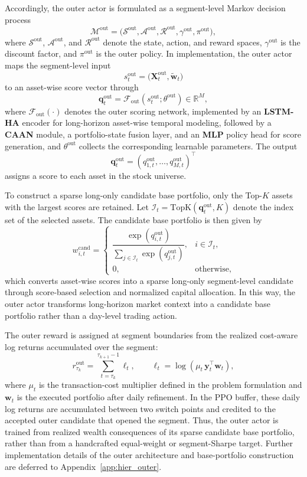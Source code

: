 \documentclass[letterpaper]{article} %
\begin{document}
Accordingly, the outer actor is formulated as a segment-level Markov decision process
\[
\mathcal{M}^{\mathrm{out}}
=
\bigl(
\mathcal{S}^{\mathrm{out}},
\mathcal{A}^{\mathrm{out}},
\mathcal{R}^{\mathrm{out}},
\gamma^{\mathrm{out}},
\pi^{\mathrm{out}}
\bigr),
\]
where \(\mathcal{S}^{\mathrm{out}}\), \(\mathcal{A}^{\mathrm{out}}\), and \(\mathcal{R}^{\mathrm{out}}\) denote the state, action, and reward spaces, \(\gamma^{\mathrm{out}}\) is the discount factor, and \(\pi^{\mathrm{out}}\) is the outer policy. In implementation, the outer actor maps the segment-level input
\[
s_{t}^{\mathrm{out}}
=
\bigl(
\mathbf{X}_{t}^{\mathrm{out}},
\tilde{\mathbf{w}}_{t}
\bigr)
\]
to an asset-wise score vector through
\[
\mathbf{q}_{t}^{\mathrm{out}}
=
\mathcal{F}_{\mathrm{out}}
\!\left(
s_{t}^{\mathrm{out}};
\theta^{\mathrm{out}}
\right)
\in\mathbb{R}^{M},
\]
where \(\mathcal{F}_{\mathrm{out}}(\cdot)\) denotes the outer scoring network, implemented by an \textbf{LSTM-HA} \citep{alphastock} encoder for long-horizon asset-wise temporal modeling, followed by a \textbf{CAAN} \citep{alphastock} module, a portfolio-state fusion layer, and an \textbf{MLP} policy head for score generation, and \(\theta^{\mathrm{out}}\) collects the corresponding learnable parameters. The output
\[
\mathbf{q}_{t}^{\mathrm{out}}
=
(q_{1,t}^{\mathrm{out}},\dots,q_{M,t}^{\mathrm{out}})^\top
\]
assigns a score to each asset in the stock universe.

To construct a sparse long-only candidate base portfolio, only the Top-\(K\) assets with the largest scores are retained. Let \(\mathcal{I}_{t}=\mathrm{TopK}(\mathbf{q}^{\mathrm{out}}_{t},K)\) denote the index set of the selected assets. The candidate base portfolio is then given by
\[
w_{i,t}^{\mathrm{cand}}
=
\begin{cases}
\dfrac{\exp(q_{i,t}^{\mathrm{out}})}
{\sum_{j\in\mathcal{I}_{t}}
\exp(q_{j,t}^{\mathrm{out}})},
& i\in\mathcal{I}_{t},\\[10pt]
0, & \text{otherwise},
\end{cases}
\]
which converts asset-wise scores into a sparse long-only segment-level candidate through score-based selection and normalized capital allocation. In this way, the outer actor transforms long-horizon market context into a candidate base portfolio rather than a day-level trading action.

The outer reward is assigned at segment boundaries from the realized cost-aware log returns accumulated over the segment:
\[
r^{\mathrm{out}}_{\tau_k}
=
\sum_{t=\tau_k}^{\tau_{k+1}-1}
\ell_t,
\qquad
\ell_t=\log\!\left(\mu_t\,\mathbf{y}_t^\top\mathbf{w}_t\right),
\]
where \(\mu_t\) is the transaction-cost multiplier defined in the problem formulation and \(\mathbf{w}_t\) is the executed portfolio after daily refinement. In the PPO buffer, these daily log returns are accumulated between two switch points and credited to the accepted outer candidate that opened the segment. Thus, the outer actor is trained from realized wealth consequences of its sparse candidate base portfolio, rather than from a handcrafted equal-weight or segment-Sharpe target. Further implementation details of the outer architecture and base-portfolio construction are deferred to Appendix~\ref{app:hier_outer}.
\end{document}
